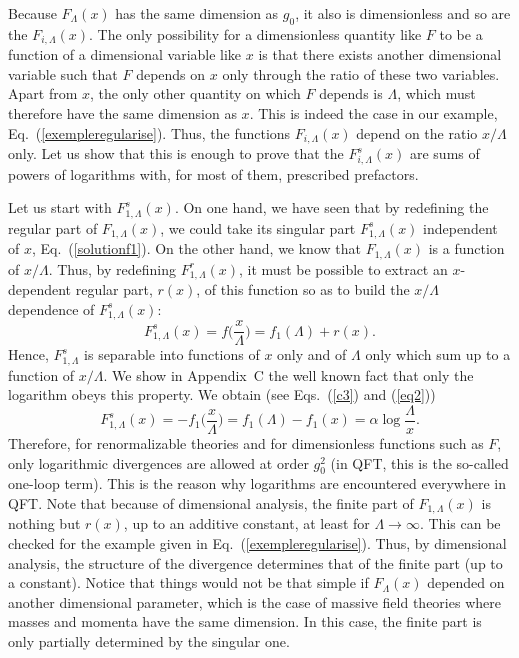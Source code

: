 \documentclass[floatfix,twocolumn,preprintnumbers,amsmath,amssymb,prb]{revtex4}
\begin{document}
Because $F_\Lambda(x)$ has the same dimension as $g_0$, it
also is dimensionless and so are the
$F_{i,\Lambda}(x)$. The only possibility for a dimensionless
quantity like $F$ to be a function of a dimensional variable like
$x$ is that there exists another dimensional variable such that
$F$ depends on $x$ only through the ratio of these two variables.
Apart from $x$, the only other quantity on which $F$ depends is
$\Lambda$, which must therefore have the same dimension as $x$.
This is indeed the case in our example,
Eq.~(\ref{exempleregularise}). Thus, the functions
$F_{i,\Lambda}(x)$ depend on the ratio $x/\Lambda$
only.\cite{foot8} Let us show that this is enough to
prove that the $F_{i,\Lambda}^s(x)$ are sums of powers of
logarithms with, for most of them, prescribed prefactors.

Let us start with $F_{1,\Lambda}^s(x)$. On one hand, we have seen
that by redefining the regular part of $F_{1,\Lambda}(x)$, we
could take its singular part $F_{1,\Lambda}^s(x)$ independent of
$x$, Eq.~(\ref{solutionf1}). On the other hand, we know that 
$F_{1,\Lambda}(x)$ is a function of $x/\Lambda$. Thus, by
redefining $F_{1,\Lambda}^r(x)$, it must be possible to extract an
$x$-dependent regular part, $r(x)$, of this function so as to build the 
$x/\Lambda$ dependence of $F_{1,\Lambda}^s(x)$:
\begin{equation}
F_{1,\Lambda}^s(x)=f\big(\frac{x}{\Lambda}\big)=f_1(\Lambda) +
r(x).
\label{eq29}
\end{equation}
Hence, $F_{1,\Lambda}^s$ is separable into functions of $x$ only and of $\Lambda$ only
which sum up to a function of $x/\Lambda$. We show in Appendix~C
the well known fact that only the logarithm obeys this property.
We obtain (see Eqs.~(\ref{c3}) and (\ref{eq2}))
\begin{equation}
F_{1,\Lambda}^s(x)=-f_1\big(\frac{x}{\Lambda}\big)=f_1(\Lambda)-f_1(x)=
\alpha
\log\frac{\Lambda}{x}.
\label{eq30}
\end{equation}
Therefore, for renormalizable theories and for dimensionless
functions such as $F$, only logarithmic divergences are allowed at
order
$g_0^2$ (in QFT, this is the so-called one-loop term). This is the
reason why logarithms are encountered everywhere in QFT. Note
that because of dimensional analysis, the finite part of
$F_{1,\Lambda}(x)$ is nothing but
$r(x)$, up to an additive constant, at least for
$\Lambda\to\infty$. This can be checked for the example given in
Eq.~(\ref{exempleregularise}). Thus, by dimensional analysis, the
structure of the divergence determines that of the finite part (up
to a constant). Notice that things would not be that simple if
$F_{\Lambda}(x)$ depended on another dimensional parameter, which
is the case of massive field theories where masses and momenta 
have the same dimension. In this case, the finite part is only
partially determined by the singular one.
\end{document}
